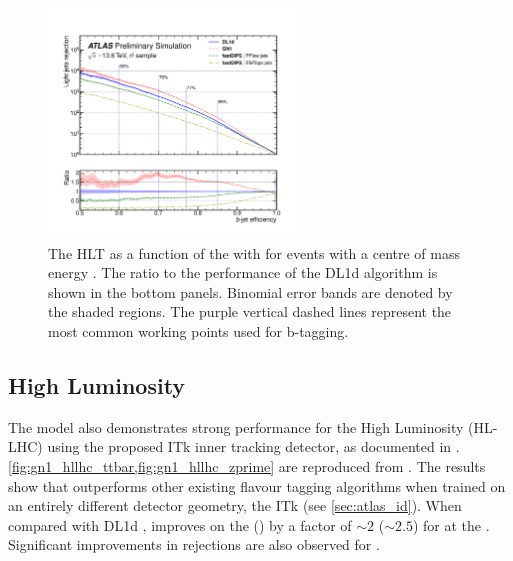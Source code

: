 \begin{figure}[!htbp]
    \centering
    \includegraphics[width=0.6\textwidth]{chapters/gnn_tagger/figs/gn1_trigger.pdf}
    \caption{
        The HLT \lrej as a function of the \beff \ttbarjets with \ttbarpt for events with a centre of mass energy  \cite{gn1-trigger}.
        The ratio to the performance of the DL1d algorithm \cite{ATLAS:2022qxm} is shown in the bottom panels.
        Binomial error bands are denoted by the shaded regions.
        The purple vertical dashed lines represent the most common working points used for b-tagging.
    }
    \label{fig:gn1_trigger}
\end{figure}

\subsection{High Luminosity \LHC}\label{sec:gnn_hllhc}
The model also demonstrates strong performance for the High Luminosity \LHC (HL-LHC) using the proposed ITk inner tracking detector, as documented in .
\cref{fig:gn1_hllhc_ttbar,fig:gn1_hllhc_zprime} are reproduced from .
The results show that \GNN outperforms other existing flavour tagging algorithms when trained on an entirely different detector geometry, the ITk (see \cref{sec:atlas_id}).
When compared with DL1d \cite{ATLAS:2022qxm}, \GNN improves on the \crej (\lrej) by a factor of $\sim 2$ ($\sim 2.5$) for \ttbarjets at the .
Significant improvements in rejections are also observed for \Zprimejets.

